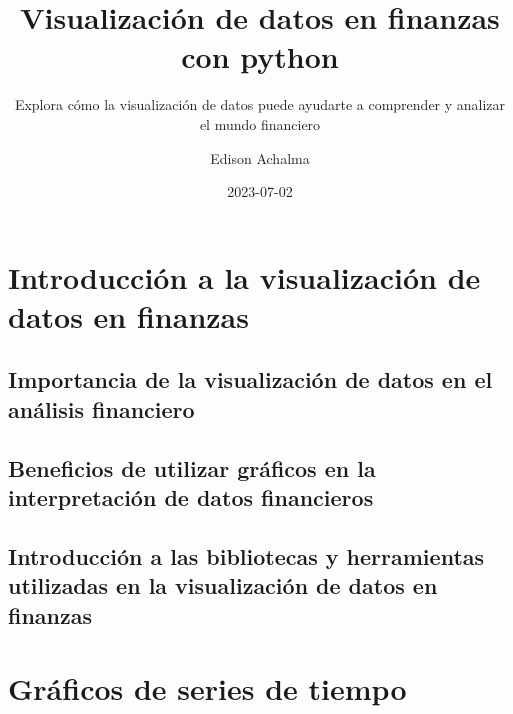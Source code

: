 \documentclass[
  a4paper,
]{article}
\title{Visualización de datos en finanzas con python}
\subtitle{Explora cómo la visualización de datos puede ayudarte a
comprender y analizar el mundo financiero}
\author{Edison Achalma}
\date{2023-07-02}
\begin{document}
\maketitle
\ifdefined\Shaded\renewenvironment{Shaded}{\begin{tcolorbox}[frame hidden, sharp corners, borderline west={3pt}{0pt}{shadecolor}, interior hidden, boxrule=0pt, breakable, enhanced]}{\end{tcolorbox}}\fi

\hypertarget{introducciuxf3n-a-la-visualizaciuxf3n-de-datos-en-finanzas}{%
\section{Introducción a la visualización de datos en
finanzas}\label{introducciuxf3n-a-la-visualizaciuxf3n-de-datos-en-finanzas}}

\hypertarget{importancia-de-la-visualizaciuxf3n-de-datos-en-el-anuxe1lisis-financiero}{%
\subsection{Importancia de la visualización de datos en el análisis
financiero}\label{importancia-de-la-visualizaciuxf3n-de-datos-en-el-anuxe1lisis-financiero}}

\hypertarget{beneficios-de-utilizar-gruxe1ficos-en-la-interpretaciuxf3n-de-datos-financieros}{%
\subsection{Beneficios de utilizar gráficos en la interpretación de
datos
financieros}\label{beneficios-de-utilizar-gruxe1ficos-en-la-interpretaciuxf3n-de-datos-financieros}}

\hypertarget{introducciuxf3n-a-las-bibliotecas-y-herramientas-utilizadas-en-la-visualizaciuxf3n-de-datos-en-finanzas}{%
\subsection{Introducción a las bibliotecas y herramientas utilizadas en
la visualización de datos en
finanzas}\label{introducciuxf3n-a-las-bibliotecas-y-herramientas-utilizadas-en-la-visualizaciuxf3n-de-datos-en-finanzas}}

\hypertarget{gruxe1ficos-de-series-de-tiempo}{%
\section{Gráficos de series de
tiempo}\label{gruxe1ficos-de-series-de-tiempo}}
\end{document}
